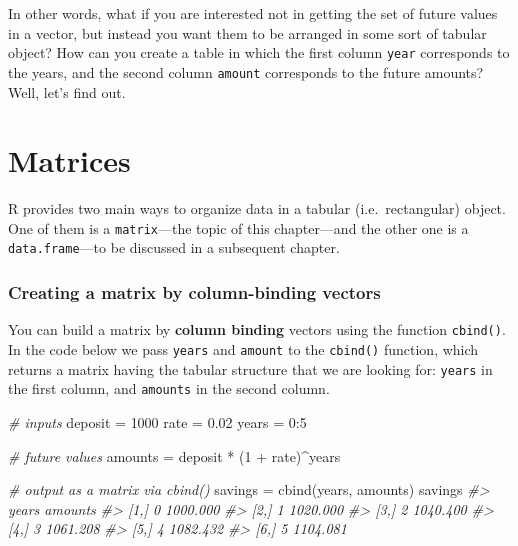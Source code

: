 \documentclass[
]{book}
\newenvironment{Shaded}{\begin{snugshade}}{\end{snugshade}}
\newcommand{\CommentTok}[1]{\textcolor[rgb]{0.56,0.35,0.01}{\textit{#1}}}
\newcommand{\DecValTok}[1]{\textcolor[rgb]{0.00,0.00,0.81}{#1}}
\newcommand{\FloatTok}[1]{\textcolor[rgb]{0.00,0.00,0.81}{#1}}
\newcommand{\FunctionTok}[1]{\textcolor[rgb]{0.00,0.00,0.00}{#1}}
\newcommand{\NormalTok}[1]{#1}
\newcommand{\OtherTok}[1]{\textcolor[rgb]{0.56,0.35,0.01}{#1}}
\newcommand{\SpecialCharTok}[1]{\textcolor[rgb]{0.00,0.00,0.00}{#1}}
\begin{document}
In other words, what if you are interested not in getting the set of future
values in a vector, but instead you want them to be arranged in some sort of
tabular object? How can you create a table in which the first column \texttt{year}
corresponds to the years, and the second column \texttt{amount} corresponds to the
future amounts? Well, let's find out.

\hypertarget{matrices}{%
\section{Matrices}\label{matrices}}

R provides two main ways to organize data in a tabular (i.e.~rectangular)
object. One of them is a \texttt{matrix}---the topic of this chapter---and the other
one is a \texttt{data.frame}---to be discussed in a subsequent chapter.

\hypertarget{creating-a-matrix-by-column-binding-vectors}{%
\subsubsection*{Creating a matrix by column-binding vectors}\label{creating-a-matrix-by-column-binding-vectors}}

You can build a matrix by \textbf{column binding} vectors using the function
\texttt{cbind()}. In the code below we pass \texttt{years} and \texttt{amount} to the \texttt{cbind()}
function, which returns a matrix having the tabular structure that we are
looking for: \texttt{years} in the first column, and \texttt{amounts} in the second column.

\begin{Shaded}
\begin{Highlighting}[]
\CommentTok{\# inputs}
\NormalTok{deposit }\OtherTok{=} \DecValTok{1000}
\NormalTok{rate }\OtherTok{=} \FloatTok{0.02}
\NormalTok{years }\OtherTok{=} \DecValTok{0}\SpecialCharTok{:}\DecValTok{5}

\CommentTok{\# future values}
\NormalTok{amounts }\OtherTok{=}\NormalTok{ deposit }\SpecialCharTok{*}\NormalTok{ (}\DecValTok{1} \SpecialCharTok{+}\NormalTok{ rate)}\SpecialCharTok{\^{}}\NormalTok{years}

\CommentTok{\# output as a matrix via cbind()}
\NormalTok{savings }\OtherTok{=} \FunctionTok{cbind}\NormalTok{(years, amounts)}
\NormalTok{savings}
\CommentTok{\#\textgreater{}      years  amounts}
\CommentTok{\#\textgreater{} [1,]     0 1000.000}
\CommentTok{\#\textgreater{} [2,]     1 1020.000}
\CommentTok{\#\textgreater{} [3,]     2 1040.400}
\CommentTok{\#\textgreater{} [4,]     3 1061.208}
\CommentTok{\#\textgreater{} [5,]     4 1082.432}
\CommentTok{\#\textgreater{} [6,]     5 1104.081}
\end{Highlighting}
\end{Shaded}
\end{document}
